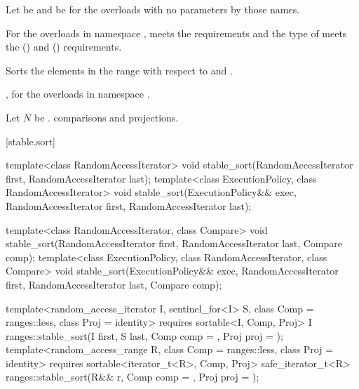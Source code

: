 \begin{itemdescr}
\pnum
Let  be 
and  be 
for the overloads with no parameters by those names.

\pnum
\expects
For the overloads in namespace ,
 meets
the  requirements and
the type of  meets
the  () and
 () requirements.

\pnum
\effects
Sorts the elements in the range 
with respect to  and .

\pnum
\returns
{}, for the overloads in namespace .

\pnum
\complexity
Let $N$ be .
 comparisons and projections.
\end{itemdescr}

[stable.sort]{}

%
\begin{itemdecl}
template<class RandomAccessIterator>
  void stable_sort(RandomAccessIterator first, RandomAccessIterator last);
template<class ExecutionPolicy, class RandomAccessIterator>
  void stable_sort(ExecutionPolicy&& exec,
                   RandomAccessIterator first, RandomAccessIterator last);

template<class RandomAccessIterator, class Compare>
  void stable_sort(RandomAccessIterator first, RandomAccessIterator last,
                   Compare comp);
template<class ExecutionPolicy, class RandomAccessIterator, class Compare>
  void stable_sort(ExecutionPolicy&& exec,
                   RandomAccessIterator first, RandomAccessIterator last,
                   Compare comp);

template<random_access_iterator I, sentinel_for<I> S, class Comp = ranges::less,
         class Proj = identity>
  requires sortable<I, Comp, Proj>
  I ranges::stable_sort(I first, S last, Comp comp = {}, Proj proj = {});
template<random_access_range R, class Comp = ranges::less, class Proj = identity>
  requires sortable<iterator_t<R>, Comp, Proj>
  safe_iterator_t<R>
    ranges::stable_sort(R&& r, Comp comp = {}, Proj proj = {});
\end{itemdecl}

